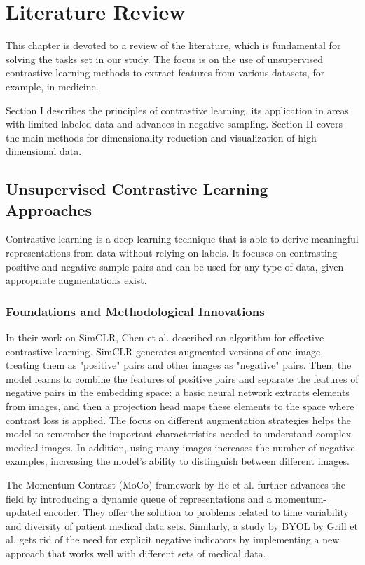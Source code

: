 \chapter{Literature Review}
\label{chap:lr}

This chapter is devoted to a review of the literature, which is fundamental for solving the tasks set in our study. The focus is on the use of unsupervised contrastive learning methods to extract features from various datasets, for example, in medicine. 

Section I describes the principles of contrastive learning, its application in areas with limited labeled data and advances in negative sampling. Section II covers the main methods for dimensionality reduction and visualization of high-dimensional data.

\section{Unsupervised Contrastive Learning Approaches}
Contrastive learning is a deep learning technique that is able to derive meaningful representations from data without relying on labels. It focuses on contrasting positive and negative sample pairs and can be used for any type of data, given appropriate augmentations exist.

\subsection{Foundations and Methodological Innovations}

In their work on SimCLR, Chen et al. \cite{tsimcne} described an algorithm for effective contrastive learning. SimCLR generates augmented versions of one image, treating them as "positive" pairs and other images as "negative" pairs. Then, the model learns to combine the features of positive pairs and separate the features of negative pairs in the embedding space: a basic neural network extracts elements from images, and then a projection head maps these elements to the space where contrast loss is applied. The focus on different augmentation strategies helps the model to remember the important characteristics needed to understand complex medical images. In addition, using many images increases the number of negative examples, increasing the model's ability to distinguish between different images.

The Momentum Contrast (MoCo) framework by He et al. \cite{moco} further advances the field by introducing a dynamic queue of representations and a momentum-updated encoder. They offer the solution to problems related to time variability and diversity of patient medical data sets. Similarly, a study by BYOL by Grill et al. \cite{byol} gets rid of the need for explicit negative indicators by implementing a new approach that works well with different sets of medical data.

